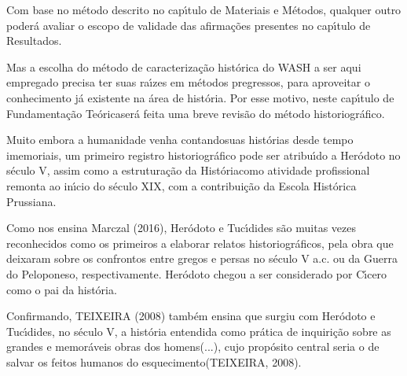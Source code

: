 \documentclass[
12pt,		%
openright,	%
twoside,  %
a4paper,			%
chapter=TITLE,		%
english,			%
french,				%
spanish,			%
brazil				%
]{USPSC-classe/USPSC}
\begin{document}
Com base no m\'etodo descrito no cap\'{\i}tulo de \textquotedbl Materiais e M\'etodos\textquotedbl , qualquer outro poder\'a avaliar o escopo de validade das afirma\c{c}\~oes presentes no cap\'{\i}tulo de \textquotedbl Resultados\textquotedbl .










Mas a escolha do m\'etodo de caracteriza\c{c}\~ao hist\'orica do WASH a ser aqui empregado precisa ter suas ra\'{\i}zes em m\'etodos pregressos, para aproveitar o conhecimento j\'a existente na \'area de hist\'oria. Por esse motivo, neste cap\'{\i}tulo de \textquotedbl Fundamenta\c{c}\~ao Te\'orica\textquotedbl  ser\'a feita uma breve revis\~ao do m\'etodo historiogr\'afico.










Muito embora a humanidade venha \textquotedbl contando\textquotedbl  suas hist\'orias desde tempo imemoriais, um primeiro registro historiogr\'afico pode ser atribu\'{\i}do a Her\'odoto no s\'eculo V, assim como a estrutura\c{c}\~ao da \textquotedbl Hist\'oria\textquotedbl  como atividade profissional remonta ao in\'{\i}cio do s\'eculo XIX, com a contribui\c{c}\~ao da Escola Hist\'orica Prussiana.










Como nos ensina  Marczal (2016),  Her\'odoto e Tuc\'{\i}dides s\~ao muitas vezes reconhecidos como os primeiros a elaborar relatos historiogr\'aficos, pela obra que deixaram sobre os confrontos entre gregos e persas no s\'eculo V a.c. ou da Guerra do Peloponeso, respectivamente. Her\'odoto chegou a ser considerado por C\'{\i}cero como o \textquotedbl pai da hist\'oria\textquotedbl  [XXX].










Confirmando, TEIXEIRA (2008)  tamb\'em ensina que surgiu com Her\'odoto e Tuc\'{\i}dides, no s\'eculo V, a hist\'oria \textquotedbl entendida como pr\'atica de inquiri\c{c}\~ao sobre as grandes e memor\'aveis obras dos homens(...), cujo prop\'osito central seria o de salvar os feitos humanos do esquecimento\textquotedbl   (TEIXEIRA, 2008).
\end{document}
